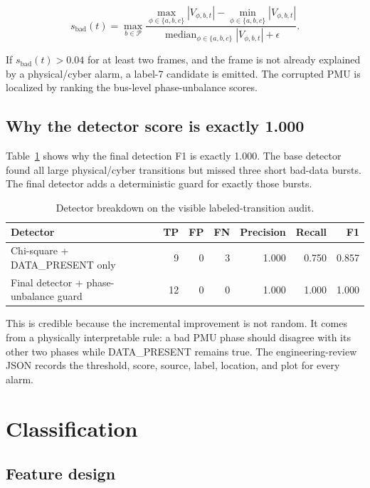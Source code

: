 \documentclass[11pt]{article}
\begin{document}
\begin{equation}
  s_{\mathrm{bad}}(t) =
  \max_{b\in\mathcal{P}}
  \frac{
    \max_{\phi\in\{a,b,c\}} |V_{\phi,b,t}|
    -
    \min_{\phi\in\{a,b,c\}} |V_{\phi,b,t}|
  }{
    \operatorname{median}_{\phi\in\{a,b,c\}} |V_{\phi,b,t}| + \epsilon
  }.
  \label{eq:badscore}
\end{equation}

If $s_{\mathrm{bad}}(t)>0.04$ for at least two frames, and the frame is not
already explained by a physical/cyber alarm, a label-7 candidate is emitted. The
corrupted PMU is localized by ranking the bus-level phase-unbalance scores.

\subsection{Why the detector score is exactly 1.000}

Table~\ref{tab:detector_breakdown} shows why the final detection F1 is exactly
1.000. The base detector found all large physical/cyber transitions but missed
three short bad-data bursts. The final detector adds a deterministic guard for
exactly those bursts.

\begin{table}[H]
\centering
\caption{Detector breakdown on the visible labeled-transition audit.}
\begin{tabular}{lrrrrrr}
\toprule
Detector & TP & FP & FN & Precision & Recall & F1 \\
\midrule
Chi-square + DATA\_PRESENT only & 9 & 0 & 3 & 1.000 & 0.750 & 0.857 \\
Final detector + phase-unbalance guard & 12 & 0 & 0 & 1.000 & 1.000 & 1.000 \\
\bottomrule
\end{tabular}
\label{tab:detector_breakdown}
\end{table}

This is credible because the incremental improvement is not random. It comes
from a physically interpretable rule: a bad PMU phase should disagree with its
other two phases while DATA\_PRESENT remains true. The engineering-review JSON
records the threshold, score, source, label, location, and plot for every alarm.

\section{Classification}

\subsection{Feature design}
\end{document}
